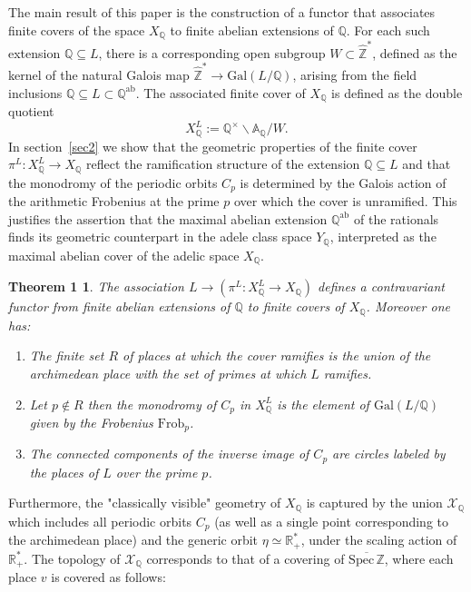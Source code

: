 \documentclass[letterpaper,11pt]{article}
\def\Q{{\mathbb Q}}
\theoremstyle{plain}
\newtheorem*{theorem1}{Theorem 1}
\begin{document}
 The main result of this paper is the construction  of a functor that associates finite covers of the space $X_\Q$ to finite abelian extensions  of $ \mathbb{Q} $. For each such extension $\Q\subseteq L $, there is a corresponding open subgroup $ W \subset \widehat{\mathbb{Z}}^* $, defined as the kernel of the natural Galois map $ \widehat{\mathbb{Z}}^* \to \text{Gal}(L/\mathbb{Q}) $, arising from the field inclusions $ \mathbb{Q} \subseteq L \subset \mathbb{Q}^{\text{ab}} $. The associated finite cover of $ X_\mathbb{Q} $ is defined as the double quotient  
$$
X_\mathbb{Q}^L := \mathbb{Q}^\times \backslash \mathbb{A}_\mathbb{Q} / W.
$$  
In section~\ref{sec2} we show that the geometric properties of the finite cover $ \pi^L: X_\mathbb{Q}^L \to X_\mathbb{Q} $ reflect the ramification structure of the extension $ \Q\subseteq L$  and that  the monodromy of the periodic orbits $C_p$ is determined by the Galois action of the arithmetic Frobenius at the prime $p$ over which the cover is unramified. This justifies the assertion that the maximal abelian extension $ \mathbb{Q}^{\text{ab}} $ of the rationals finds its geometric counterpart in the adele class space $ Y_\mathbb{Q}$,  interpreted as the maximal abelian cover  of the adelic space $ X_\mathbb{Q} $.
 \begin{theorem1}\label{mainintro}
  The association $L \rightarrow\left(\pi^L: X_{\Q}^L \to X_{\mathbb{Q}}\right)$ defines a contravariant functor from finite abelian extensions of $\Q$ to finite covers of $X_\Q$. Moreover one has:
  \begin{enumerate}
\item[(i)] The finite set $R$ of places at which the cover ramifies is the union of the archimedean place with the set of primes at which $L$ ramifies.
\item[(ii)] Let $p \notin R$ then the monodromy of $C_p$ in $X_{\mathbb{Q}}^L$ is the element of $\text{Gal}(L/\mathbb{Q})$ given by the Frobenius $\mathrm{Frob}_p$.
\item[(iii)] The connected components of the inverse image of $C_p$ are circles labeled by the places of $L$ over the prime $p$. 
\end{enumerate}
 \end{theorem1}
 Furthermore, the "classically visible" geometry of $ X_\mathbb{Q} $ is captured by the union $ \mathcal{X}_\mathbb{Q} $ which includes all periodic orbits $ C_p $ (as well as a single point corresponding to the archimedean place) and the generic orbit $ \eta \simeq \mathbb{R}_+^* $, under the scaling action of $ \mathbb{R}_+^* $. The topology of $ \mathcal{X}_\mathbb{Q} $ corresponds to that of a covering of $ \overline{\text{Spec} \, \mathbb{Z}} $, where each place $ v $ is covered as follows:\vspace{.02in}  
\end{document}
